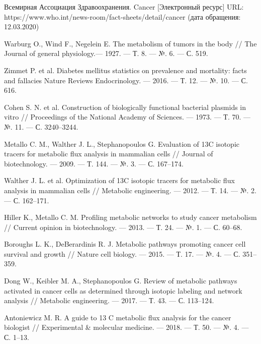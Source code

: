 \documentclass[14pt, a4paper]{extreport}
\begin{document}
\cleardoublepage
{}
{}
\renewcommand{\bibname}{Список литературы}
\begin{thebibliography}{XXXX}
	Всемирная Ассоциация Здравоохранения. Cancer [Электронный ресурс] URL: https://www.who.int/news-room/fact-sheets/detail/cancer (дата обращения: 12.03.2020)
	
	Warburg O., Wind F., Negelein E. The metabolism of tumors in the body // The Journal of general physiology.--- 1927. --- Т. 8. --- №. 6. --- С. 519.
	
	Zimmet P. et al. Diabetes mellitus statistics on prevalence and mortality: facts and fallacies Nature Reviews Endocrinology. --- 2016. --- Т. 12. --- №. 10. --- С. 616.
	
	Cohen S. N. et al. Construction of biologically functional bacterial plasmids in vitro // Proceedings of the National Academy of Sciences. --- 1973. --- Т. 70. --- №. 11. --- С. 3240--3244.
	
	Metallo C. M., Walther J. L., Stephanopoulos G. Evaluation of 13C isotopic tracers for metabolic flux analysis in mammalian cells // Journal of biotechnology. --- 2009. --- Т. 144. --- №. 3. --- С. 167--174.
	
	Walther J. L. et al. Optimization of 13C isotopic tracers for metabolic flux analysis in mammalian cells // Metabolic engineering. --- 2012. --- Т. 14. --- №. 2. --- С. 162--171.
	
	Hiller K., Metallo C. M. Profiling metabolic networks to study cancer metabolism // Current opinion in biotechnology. --- 2013. --- Т. 24. --- №. 1. --- С. 60--68.
	
	Boroughs L. K., DeBerardinis R. J. Metabolic pathways promoting cancer cell survival and growth // Nature cell biology. --- 2015. --- Т. 17. --- №. 4. --- С. 351--359.
	
	Dong W., Keibler M. A., Stephanopoulos G. Review of metabolic pathways activated in cancer cells as determined through isotopic labeling and network analysis // Metabolic engineering. --- 2017. --- Т. 43. --- С. 113--124.
	
	Antoniewicz M. R. A guide to 13 C metabolic flux analysis for the cancer biologist // Experimental \& molecular medicine. --- 2018. --- Т. 50. --- №. 4. --- С. 1--13.
	

\end{thebibliography}
\end{document}
